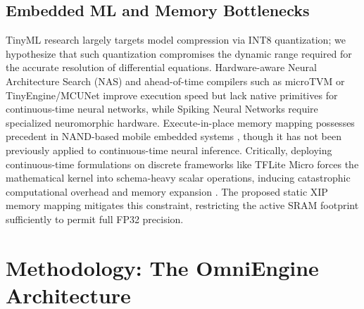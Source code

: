 \documentclass[conference]{IEEEtran}
\begin{document}
\subsection{Embedded ML and Memory Bottlenecks}
TinyML research \cite{warden2020tinyml} largely targets model compression via INT8 quantization; we hypothesize that such quantization compromises the dynamic range required for the accurate resolution of differential equations. Hardware-aware Neural Architecture Search (NAS) \cite{cai2018proxyless} and ahead-of-time compilers such as microTVM or TinyEngine/MCUNet \cite{lin2020mcunet} improve execution speed but lack native primitives for continuous-time neural networks, while Spiking Neural Networks \cite{roy2019snn} require specialized neuromorphic hardware. Execute-in-place memory mapping possesses precedent in NAND-based mobile embedded systems \cite{kim2014nandxip}, though it has not been previously applied to continuous-time neural inference. Critically, deploying continuous-time formulations on discrete frameworks like TFLite Micro \cite{david2021tflitemicro} forces the mathematical kernel into schema-heavy scalar operations, inducing catastrophic computational overhead and memory expansion \cite{banbury2021mlperftiny}. The proposed static XIP memory mapping mitigates this constraint, restricting the active SRAM footprint sufficiently to permit full FP32 precision.

\section{Methodology: The OmniEngine Architecture}
\end{document}
